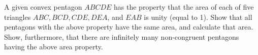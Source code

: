 A given convex pentagon $ ABCDE$ has the property that the area of each of five triangles $ ABC, BCD, CDE, DEA$,  and $ EAB$ is unity (equal to 1). Show that all pentagons with the above property have the same area, and calculate that area. Show, furthermore, that there are infinitely many non-congruent pentagons having the above area property.
